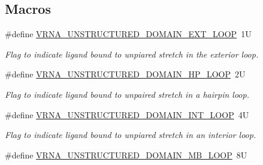 \subsection*{Macros}
\begin{DoxyCompactItemize}
\item 
\#define \hyperlink{group__domains__up_gaac911374e86236a51bfd42e1f098eaba}{V\+R\+N\+A\+\_\+\+U\+N\+S\+T\+R\+U\+C\+T\+U\+R\+E\+D\+\_\+\+D\+O\+M\+A\+I\+N\+\_\+\+E\+X\+T\+\_\+\+L\+O\+OP}~1U\hypertarget{group__domains__up_gaac911374e86236a51bfd42e1f098eaba}{}\label{group__domains__up_gaac911374e86236a51bfd42e1f098eaba}

\begin{DoxyCompactList}\small\item\em Flag to indicate ligand bound to unpiared stretch in the exterior loop. \end{DoxyCompactList}\item 
\#define \hyperlink{group__domains__up_ga23b610ea9564346c45cc1e2bbb62adf7}{V\+R\+N\+A\+\_\+\+U\+N\+S\+T\+R\+U\+C\+T\+U\+R\+E\+D\+\_\+\+D\+O\+M\+A\+I\+N\+\_\+\+H\+P\+\_\+\+L\+O\+OP}~2U\hypertarget{group__domains__up_ga23b610ea9564346c45cc1e2bbb62adf7}{}\label{group__domains__up_ga23b610ea9564346c45cc1e2bbb62adf7}

\begin{DoxyCompactList}\small\item\em Flag to indicate ligand bound to unpaired stretch in a hairpin loop. \end{DoxyCompactList}\item 
\#define \hyperlink{group__domains__up_gac4a0feccd9654c149203200248c2716b}{V\+R\+N\+A\+\_\+\+U\+N\+S\+T\+R\+U\+C\+T\+U\+R\+E\+D\+\_\+\+D\+O\+M\+A\+I\+N\+\_\+\+I\+N\+T\+\_\+\+L\+O\+OP}~4U\hypertarget{group__domains__up_gac4a0feccd9654c149203200248c2716b}{}\label{group__domains__up_gac4a0feccd9654c149203200248c2716b}

\begin{DoxyCompactList}\small\item\em Flag to indicate ligand bound to unpiared stretch in an interior loop. \end{DoxyCompactList}\item 
\#define \hyperlink{group__domains__up_ga67b80796655e5227a4ed662bfbe398b0}{V\+R\+N\+A\+\_\+\+U\+N\+S\+T\+R\+U\+C\+T\+U\+R\+E\+D\+\_\+\+D\+O\+M\+A\+I\+N\+\_\+\+M\+B\+\_\+\+L\+O\+OP}~8U\hypertarget{group__domains__up_ga67b80796655e5227a4ed662bfbe398b0}{}\label{group__domains__up_ga67b80796655e5227a4ed662bfbe398b0}


\end{DoxyCompactItemize}
